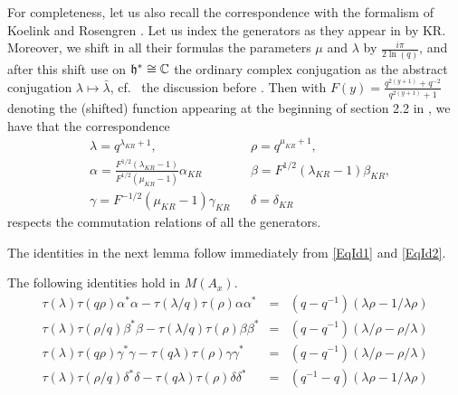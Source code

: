 




For completeness, let us also recall the correspondence with the formalism of Koelink and Rosengren \cite{KoR1}. Let us index the generators as they appear in \cite[Definition 2.6]{KoR1} by KR. Moreover, we shift in all their formulas the parameters $\mu$ and $\lambda$ by $\frac{i\pi}{2\ln(q)}$, and after this shift use on $\mathfrak{h}^* \cong \mathbb{C}$ the ordinary complex conjugation as the abstract conjugation $\lambda \mapsto \bar{\lambda}$, cf.~ the discussion before \cite[Definition 2.8]{KoR1}. Then with $F(y) = \frac{q^{2(y+1)}+q^{-2}}{q^{2(y+1)}+1}$ denoting the (shifted) function appearing at the beginning of section 2.2 in \cite{KoR1}, we have that the correspondence \begin{align*} &\lambda = q^{\lambda_{KR}+1},&& \rho = q^{\mu_{KR}+1},\\ &\alpha = \frac{F^{1/2}(\lambda_{KR}-1)}{F^{1/2}(\mu_{KR}-1)}\alpha_{KR}&& \beta = F^{1/2}(\lambda_{KR}-1)\beta_{KR},\\ &\gamma = F^{-1/2}(\mu_{KR}-1)\gamma_{KR}&& \delta = \delta_{KR}\end{align*} respects the commutation relations of all the generators. 

The identities in the next lemma follow immediately from \eqref{EqId1} and \eqref{EqId2}.

\begin{Lem} The following identities hold in $M(A_x)$. \begin{eqnarray}\label{EqId3} \tau(\lambda)\tau(q\rho)\alpha^*\alpha -\tau(\lambda/q)\tau(\rho)\alpha\alpha^* &=& (q-q^{-1})(\lambda\rho-1/\lambda\rho) \\
 \label{EqId4} \tau(\lambda)\tau(\rho/q) \beta^*\beta - \tau(\lambda/q)\tau(\rho) \beta\beta^* &=& (q-q^{-1})(\lambda/\rho-\rho/\lambda) \\  
  \tau(\lambda)\tau(q\rho)\gamma^*\gamma -\tau(q\lambda)\tau(\rho)  \gamma\gamma^* &=& (q-q^{-1})(\lambda/\rho-\rho/\lambda) \\
 \tau(\lambda)\tau(\rho/q)\delta^*\delta - \tau(q\lambda)\tau(\rho)\delta\delta^*   &=&  (q^{-1}-q)(\lambda\rho-1/\lambda\rho) 
 \end{eqnarray}


\end{Lem} 

